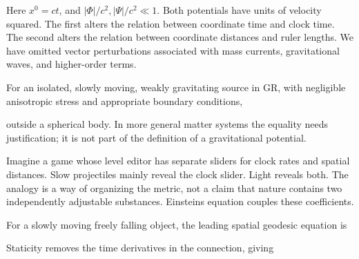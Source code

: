 \documentclass[
  11pt,
  letterpaper,
  oneside,
  openany]{scrbook}
\begin{document}
Here \(x^0=ct\), and \(|\Phi|/c^2,|\Psi|/c^2\ll1\). Both potentials have
units of velocity squared. The first alters the relation between
coordinate time and clock time. The second alters the relation between
coordinate distances and ruler lengths. We have omitted vector
perturbations associated with mass currents, gravitational waves, and
higher-order terms.

For an isolated, slowly moving, weakly gravitating source in GR, with
negligible anisotropic stress and appropriate boundary conditions,

\begin{center}
\begingroup
{}
\ifdim\wd\grmathbox>\linewidth
\resizebox{\linewidth}{!}{\usebox{\grmathbox}}
\else\usebox{\grmathbox}\fi
\endgroup
\end{center}

outside a spherical body. In more general matter systems the equality
needs justification; it is not part of the definition of a gravitational
potential.

Imagine a game whose level editor has separate sliders for clock rates
and spatial distances. Slow projectiles mainly reveal the clock slider.
Light reveals both. The analogy is a way of organizing the metric, not a
claim that nature contains two independently adjustable substances.
Einstein\textquotesingle s equation couples these coefficients.

For a slowly moving freely falling object, the leading spatial geodesic
equation is

\begin{center}
\begingroup
{}
\ifdim\wd\grmathbox>\linewidth
\resizebox{\linewidth}{!}{\usebox{\grmathbox}}
\else\usebox{\grmathbox}\fi
\endgroup
\end{center}

Staticity removes the time derivatives in the connection, giving

\begin{center}
\begingroup
{}
\ifdim\wd\grmathbox>\linewidth
\resizebox{\linewidth}{!}{\usebox{\grmathbox}}
\else\usebox{\grmathbox}\fi
\endgroup
\end{center}
\end{document}
